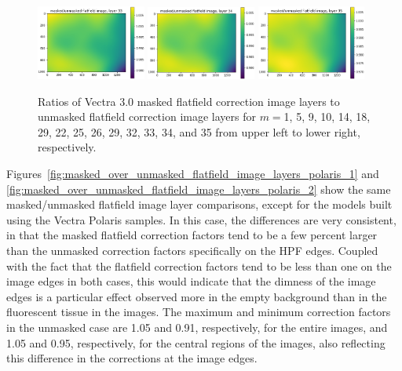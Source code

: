 \documentclass[letterpaper,11pt]{article}
\begin{document}
\begin{figure}[!ht]
\includegraphics[width=0.32\textwidth]{images/results/masked_over_unmasked_flatfield_image_layers_vectra/masked_over_unmasked_flatfield_image_layer_33}
\includegraphics[width=0.32\textwidth]{images/results/masked_over_unmasked_flatfield_image_layers_vectra/masked_over_unmasked_flatfield_image_layer_34}
\includegraphics[width=0.32\textwidth]{images/results/masked_over_unmasked_flatfield_image_layers_vectra/masked_over_unmasked_flatfield_image_layer_35}
\caption{\footnotesize Ratios of Vectra 3.0 masked flatfield correction image layers to unmasked flatfield correction image layers for $m=$1, 5, 9, 10, 14, 18, 29, 22, 25, 26, 29, 32, 33, 34, and 35 from upper left to lower right, respectively.}
\label{fig:masked_over_unmasked_flatfield_image_layers_vectra}
\end{figure}

Figures~\ref{fig:masked_over_unmasked_flatfield_image_layers_polaris_1} and \ref{fig:masked_over_unmasked_flatfield_image_layers_polaris_2} show the same masked/unmasked flatfield image layer comparisons, except for the models built using the Vectra Polaris samples. In this case, the differences are very consistent, in that the masked flatfield correction factors tend to be a few percent larger than the unmasked correction factors specifically on the HPF edges. Coupled with the fact that the flatfield correction factors tend to be less than one on the image edges in both cases, this would indicate that the dimness of the image edges is a particular effect observed more in the empty background than in the fluorescent tissue in the images. The maximum and minimum correction factors in the unmasked case are 1.05 and 0.91, respectively, for the entire images, and 1.05 and 0.95, respectively, for the central regions of the images, also reflecting this difference in the corrections at the image edges.
\end{document}
